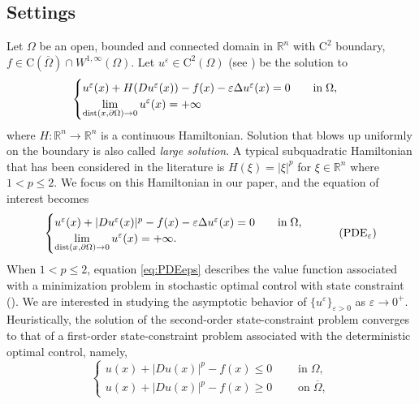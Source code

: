 \documentclass[12pt,reqno]{amsart}
\numberwithin{figure}{section}
\theoremstyle{plain}
\theoremstyle{remark}
\numberwithin{equation}{section}
\newcommand{\R}{\mathbb{R}}
\begin{document}
\subsection{Settings} Let $\Omega$ be an open, bounded and connected domain in $\mathbb{R}^n$ with $\mathrm{C}^2$ boundary, $f\in \mathrm{C}(\overline{\Omega})\cap W^{1,\infty}(\Omega)$. Let $u^\varepsilon\in \mathrm{C}^2(\Omega)$ (see \cite{Lasry1989}) be the solution to
 \begin{equation}\label{eq:PDEepsa}
    \begin{cases}
      u^\varepsilon(x) + H(Du^\varepsilon(x)) - f(x) - \varepsilon \Delta u^\varepsilon(x) = 0 \qquad
    \text{in}\;\Omega, \vspace{0cm}\\
    \displaystyle  \lim_{\mathrm{dist}(x,\partial \Omega)\to 0} u^\varepsilon(x) = +\infty
    \end{cases} 
\end{equation}
 where $H:\R^n\to\R^n$ is a continuous Hamiltonian. Solution that blows up uniformly on the boundary is also called \emph{large solution}. A typical subquadratic Hamiltonian that has been considered in the literature is $H(\xi) = |\xi|^p$ for $\xi\in \R^n$ where $1<p\leq 2$. We focus on this Hamiltonian in our paper, and the equation of interest becomes
\begin{equation}\label{eq:PDEeps}
    \begin{cases}
      u^\varepsilon(x) + |Du^\varepsilon(x)|^p - f(x) - \varepsilon \Delta u^\varepsilon(x) = 0 \qquad
    \text{in}\;\Omega, \vspace{0cm}\\
    \displaystyle  \lim_{\mathrm{dist}(x,\partial \Omega)\to 0} u^\varepsilon(x) = +\infty.
    \end{cases} \tag{PDE$_\varepsilon$}
\end{equation}
When $1<p\leq 2$, equation \eqref{eq:PDEeps} describes the value function associated with a minimization problem in stochastic optimal control with state constraint (\cite{Lasry1989}). We are interested in studying the asymptotic behavior of $\{u^\varepsilon\}_{\varepsilon>0}$ as $\varepsilon\rightarrow 0^+$. Heuristically, the solution of the second-order state-constraint problem converges to that of a first-order state-constraint problem associated with the deterministic optimal control, namely,
\begin{equation}\label{eq:PDE0}
    \begin{cases}
       u(x) + |Du(x)|^p - f(x) \leq 0\;\qquad\text{in}\;\Omega,\\
       u(x) + |Du(x)|^p - f(x) \geq 0\;\qquad\text{on}\;\overline{\Omega},
    \end{cases} \tag{PDE$_0$}
\end{equation}
\end{document}
